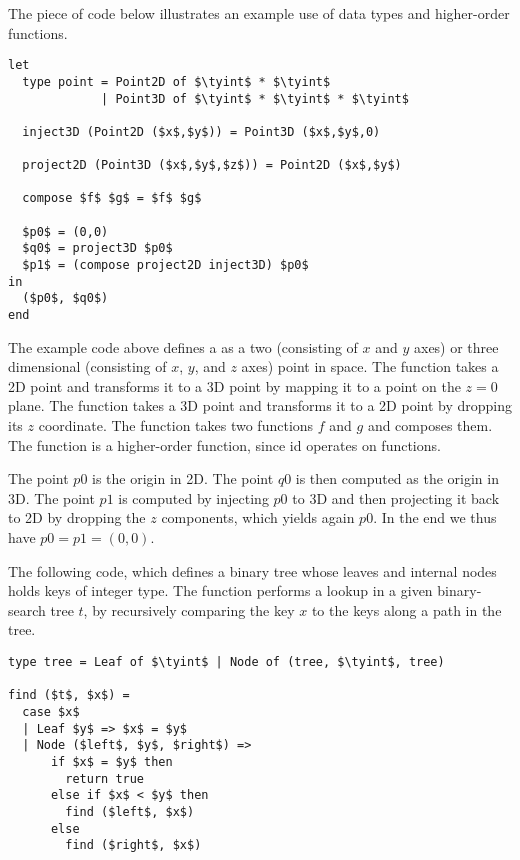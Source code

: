 \begin{example}
The piece of code below illustrates an example use of data types and
higher-order functions.
%
\begin{lstlisting}
let 
  type point = Point2D of $\tyint$ * $\tyint$ 
             | Point3D of $\tyint$ * $\tyint$ * $\tyint$

  inject3D (Point2D ($x$,$y$)) = Point3D ($x$,$y$,0)
  
  project2D (Point3D ($x$,$y$,$z$)) = Point2D ($x$,$y$)
 
  compose $f$ $g$ = $f$ $g$  

  $p0$ = (0,0)
  $q0$ = project3D $p0$
  $p1$ = (compose project2D inject3D) $p0$
in 
  ($p0$, $q0$)
end

\end{lstlisting}

The example code above defines a  as a two (consisting of
$x$ and $y$ axes) or three dimensional (consisting of $x$, $y$, and
$z$ axes) point in space.
%
The function  takes a 2D point and transforms it to a 3D
point by mapping it to a point on the $z=0$ plane. 
%
The function  takes a 3D point and transforms it to a 2D
point by dropping its $z$ coordinate.
%
The function  takes two functions $f$ and $g$ and composes
them.
%
The function  is a higher-order function, since id operates
on functions.

The point $p0$ is the origin in 2D.  The point $q0$ is then computed
as the origin in 3D.  The point $p1$ is computed by injecting $p0$ to
3D and then projecting it back to 2D by dropping the $z$ components,
which yields again $p0$.  
%
In the end we thus have $p0 = p1 = (0,0)$. 

\end{example}




\begin{example}
The following \pml code, which defines a binary tree whose leaves and
internal nodes holds keys of integer type.
%
The function  performs a lookup in a given binary-search tree
$t$, by recursively comparing the key $x$ to the keys along a path in
the tree.

\begin{lstlisting}
type tree = Leaf of $\tyint$ | Node of (tree, $\tyint$, tree)

find ($t$, $x$) = 
  case $x$ 
  | Leaf $y$ => $x$ = $y$ 
  | Node ($left$, $y$, $right$) =>
      if $x$ = $y$ then 
        return true
      else if $x$ < $y$ then 
        find ($left$, $x$)
      else
        find ($right$, $x$)
\end{lstlisting}
\end{example}



